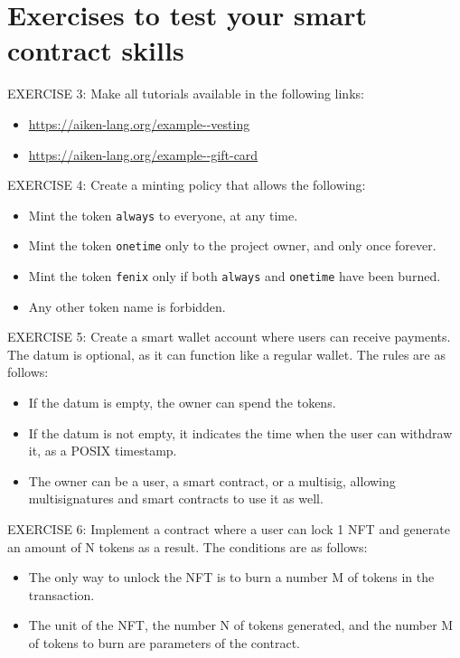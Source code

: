 \section{Exercises to test your smart contract skills}
\begin{remark}
    EXERCISE 3: Make all tutorials available in the following links:
    \begin{itemize}
        \item \url{https://aiken-lang.org/example--vesting}
        \item \url{https://aiken-lang.org/example--gift-card}
    \end{itemize}
\end{remark}

\begin{remark}
    EXERCISE 4: Create a minting policy that allows the following:
    \begin{itemize}
        \item Mint the token \texttt{always} to everyone, at any time.
        \item Mint the token \texttt{onetime} only to the project owner, and only once forever.
        \item Mint the token \texttt{fenix} only if both \texttt{always} and \texttt{onetime} have been burned.
        \item Any other token name is forbidden.
    \end{itemize}
\end{remark}

\begin{remark}
    EXERCISE 5: Create a smart wallet account where users can receive payments. The datum is optional, as it can function like a regular wallet. The rules are as follows:
    \begin{itemize}
        \item If the datum is empty, the owner can spend the tokens.
        \item If the datum is not empty, it indicates the time when the user can withdraw it, as a POSIX timestamp.
        \item The owner can be a user, a smart contract, or a multisig, allowing multisignatures and smart contracts to use it as well.
    \end{itemize}
\end{remark}

\begin{remark}
    EXERCISE 6: Implement a contract where a user can lock 1 NFT and generate an amount of N tokens as a result. The conditions are as follows:
    \begin{itemize}
        \item The only way to unlock the NFT is to burn a number M of tokens in the transaction.
        \item The unit of the NFT, the number N of tokens generated, and the number M of tokens to burn are parameters of the contract.
    \end{itemize}
\end{remark}
